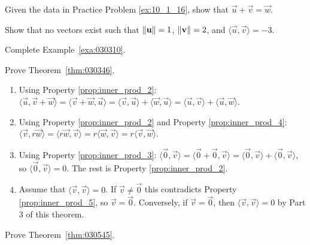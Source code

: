 \documentclass{ximera}
\begin{document}
\begin{problem}\label{prob:inner_prod_17}
Given the data in Practice Problem \ref{ex:10_1_16}, show that $\vec{u} + \vec{v} = \vec{w}$.
\end{problem}

\begin{problem}\label{prob:inner_prod_18}
Show that no vectors exist such that $\left\lVert\mathbf{u}\right\rVert = 1$, $\left\lVert\mathbf{v}\right\rVert = 2$, and $\langle\vec{u}, \vec{v}\rangle = -3$.
\end{problem}

\begin{problem} \label{ex:10_1_19}
Complete Example~\ref{exa:030310}.
\end{problem}

\begin{problem} \label{ex:10_1_20}
Prove Theorem~\ref{thm:030346}.

\begin{hint}
\begin{enumerate}
\item Using Property \ref{prop:inner_prod_2}:
$ \langle \vec{u}, \vec{v} + \vec{w} \rangle =
\langle \vec{v} + \vec{w}, \vec{u} \rangle =
\langle \vec{v}, \vec{u} \rangle + \langle \vec{w}, \vec{u} \rangle =
\langle \vec{u}, \vec{v} \rangle + \langle \vec{u}, \vec{w} \rangle$.

\item Using Property \ref{prop:inner_prod_2} and Property \ref{prop:inner_prod_4}:
$\langle \vec{v}, r\vec{w} \rangle =
\langle r\vec{w}, \vec{v} \rangle =
r \langle \vec{w}, \vec{v} \rangle =
r \langle \vec{v}, \vec{w} \rangle$.

\item Using Property \ref{prop:inner_prod_3}:
$\langle \vec{0}, \vec{v} \rangle =
\langle \vec{0} + \vec{0}, \vec{v} \rangle =
\langle \vec{0}, \vec{v} \rangle + \langle \vec{0}, \vec{v} \rangle
$, so $ \langle \vec{0}, \vec{v} \rangle = 0$. The rest is Property \ref{prop:inner_prod_2}.

\item Assume that $\langle \vec{v}, \vec{v} \rangle = 0$. If $\vec{v} \neq \vec{0}$ this contradicts Property \ref{prop:inner_prod_5}, so $\vec{v} = \vec{0}$. Conversely, if $\vec{v} = \vec{0}$, then $\langle \vec{v}, \vec{v} \rangle = 0$ by Part 3 of this theorem.
\end{enumerate}
\end{hint}
\end{problem}

\begin{problem} \label{ex:10_1_21}
Prove Theorem~\ref{thm:030545}.
\end{problem}
\end{document}
